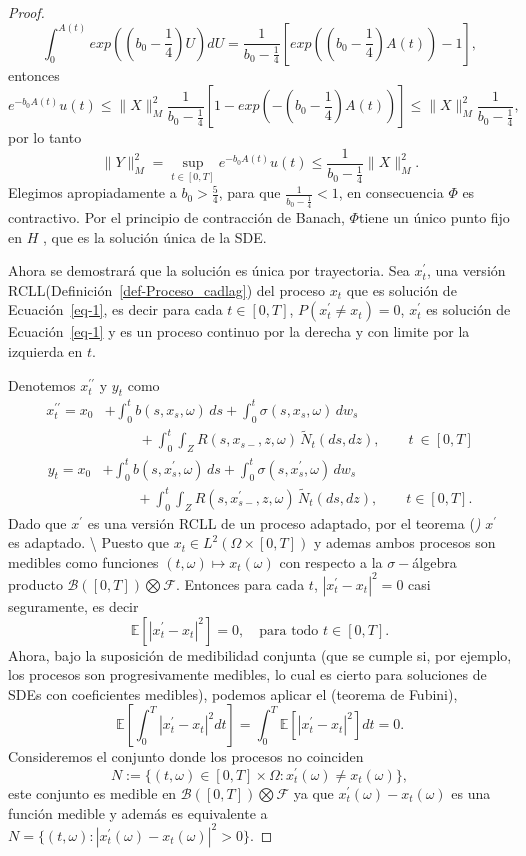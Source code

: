 \documentclass[
  spanish,
  us-letterpaper,
]{scrreprt}
\theoremstyle{plain}
\theoremstyle{plain}
\theoremstyle{definition}
\theoremstyle{remark}
\begin{document}
\begin{proof}
\[\int_0^{A(t)}exp\left(\left( b_0 - \frac{1}{4}\right)U\right)dU = \frac{1}{b_0 - \frac{1}{4}}\left[exp\left(\left(b_0-\frac{1}{4}\right)A(t)\right)-1\right],\]
entonces
\[e^{-b_0A(t)} u(t) \leq \|{X}\|_M^2 \frac{1}{b_0-\frac{1}{4}}\left[1-exp\left(-\left(b_0-\frac{1}{4}\right)A(t)\right)\right]\leq\|{X}\|_M^2\frac{1}{b_0-\frac{1}{4}},\]
por lo tanto
\[\|{Y}\|_M^2 = \sup_{t\in[0,T]}e^{-b_0A(t)}u(t)\leq\frac{1}{b_0-\frac{1}{4}} \|{X}\|_M^2.\]
Elegimos apropiadamente a \(b_0>\frac{5}{4}\), para que
\(\frac{1}{b_0-\frac{1}{4}}<1\), en consecuencia \(\Phi\) es
contractivo. Por el principio de contracción de Banach, \(\Phi\)tiene un
único punto fijo en \(H\) , que es la solución única de la SDE.

Ahora se demostrará que la solución es única por trayectoria. Sea
\(x^{\prime}_{t}\), una versión
RCLL(Definición~\ref{def-Proceso_cadlag}) del proceso \(x_t\) que es
solución de Ecuación~\ref{eq-1}, es decir para cada \(t \in [0,T]\),
\(P(x^{\prime}_{t} \neq x_t) = 0\), \(x^{\prime}_{t}\) es solución de
Ecuación~\ref{eq-1} y es un proceso continuo por la derecha y con limite
por la izquierda en \(t.\)

Denotemos \(x^{\prime\prime}_{t}\) y \(y_t\) como \begin{align*}
x^{\prime\prime}_t = x_0 &+ \int_0^t b(s,x_s,\omega)\,ds 
           + \int_0^t \sigma(s,x_s,\omega)\,dw_s \\
          & \ \ \ \ \ \ \ \ \ \ \ +  \int_0^t\!\int_Z R(s,x_{s-},z,\omega)\,\tilde{N}_t(ds,dz),
          \qquad t\ \in [0,T]
\end{align*} \begin{align*}
y_t = x_0 &+ \int_0^t b(s,x^{\prime}_s,\omega)\,ds 
           + \int_0^t \sigma(s,x^{\prime}_s,\omega)\,dw_s \\
          & \ \ \ \ \ \ \ \ \ \ \ +  \int_0^t\!\int_Z R(s,x^{\prime}_{s-},z,\omega)\,\tilde{N}_t(ds,dz),
          \qquad t\in [0,T].
\end{align*} Dado que \(x^{\prime}\) es una versión RCLL de un proceso
adaptado, por el teorema (\emph{)} \(x^{\prime}\) es adaptado.
\textbackslash{} Puesto que \(x_t \in L^2(\Omega \times [0,T])\) y
ademas ambos procesos son medibles como funciones
\((t,\omega) \mapsto x_t(\omega)\) con respecto a la \(\sigma-\)álgebra
producto \(\mathcal{B}([0,T])\bigotimes\mathcal{F}.\) Entonces para cada
\(t\), \(|x^{\prime}_t - x_t|^2 =0\) casi seguramente, es decir
\[\mathbb{E}[|x^{\prime}_t - x_t|^2] = 0, \quad \text{para todo } t \in [0,T]. \]
Ahora, bajo la suposición de medibilidad conjunta (que se cumple si, por
ejemplo, los procesos son progresivamente medibles, lo cual es cierto
para soluciones de SDEs con coeficientes medibles), podemos aplicar el
(teorema de Fubini),
\[\mathbb{E}[\int_0^T|x^{\prime}_t - x_t|^2dt] = \int_0^T\mathbb{E}[|x^{\prime}_t - x_t|^2]dt =0.\]
Consideremos el conjunto donde los procesos no coinciden
\[N := \{(t,\omega) \in [0,T]\times \Omega : x^{\prime}_t(\omega)\neq x_t(\omega)\},\]
este conjunto es medible en \(\mathcal{B}([0,T])\bigotimes\mathcal{F}\)
ya que \(x^{\prime}_t(\omega) - x_t(\omega)\) es una función medible y
además es equivalente a
\(N = \{(t,\omega) : |x^{\prime}_t(\omega)- x_t(\omega)|^2>0\}.\)


\end{proof}
\end{document}
